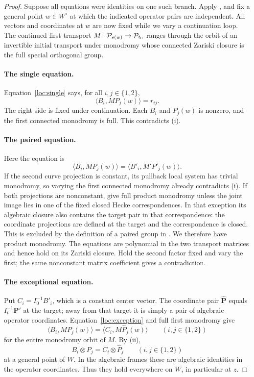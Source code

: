\begin{proof}
Suppose all equations were identities on one such branch.  Apply
, and fix a general point $w\in W^\circ$ at which
the indicated operator pairs are independent.  All vectors and
coordinates at $w$ are now fixed while we vary a continuation loop.
The continued first transport $M:\mathcal P_{s(w)}\to\mathcal P_{t_0}$ ranges through
the orbit of an invertible initial transport under monodromy whose
connected Zariski closure is the full special orthogonal group.

\paragraph{The single equation.}
Equation~\eqref{loc:single} says, for all $i,j\in\{1,2\}$,
\[
 \langle B_i,MP_j(w)\rangle=r_{ij}.
\]
The right side is fixed under continuation.  Each $B_i$ and $P_j(w)$
is nonzero, and the first connected monodromy is full.  This contradicts
(i).

\paragraph{The paired equation.}
Here the equation is
\[
 \langle B_i,MP_j(w)\rangle
   =\langle B'_i,M'P'_j(w)\rangle.
\]
If the second curve projection is constant, its pullback local system
has trivial monodromy, so varying the first connected monodromy already
contradicts (i).  If both projections are
nonconstant,  give full product
monodromy unless the joint image lies in one of the fixed closed Hecke
correspondences.  In that exception its algebraic closure also contains
the target pair in that correspondence: the coordinate projections are
defined at the target and the correspondence is closed.  This is
excluded by the definition of a paired group in .
We therefore have product monodromy.  The equations are polynomial in
the two transport matrices and hence hold on its Zariski closure.
Hold the second factor fixed and vary the first; the same nonconstant
matrix coefficient gives a contradiction.

\paragraph{The exceptional equation.}
Put $C_i=I_0^{-1}B'_i$, which is a constant center vector.  The coordinate
pair $\widehat{\mathbf P}$ equals $I_t^{-1}\mathbf P'$ at the target;
away from that target it is simply a pair of algebraic operator
coordinates.  Equation~\eqref{loc:exception} and full first monodromy
give
\[
 \langle B_i,MP_j(w)\rangle
   =\langle C_i,M\widehat P_j(w)\rangle
       \qquad(i,j\in\{1,2\})
\]
for the entire monodromy orbit of $M$.  By
(ii),
\begin{equation}
 \label{nid:tensors}
 B_i\otimes P_j=C_i\otimes\widehat P_j
       \qquad(i,j\in\{1,2\})
\end{equation}
at a general point of $W$.  In the algebraic frames these are algebraic
identities in the operator coordinates.  Thus they hold everywhere on
$W$, in particular at $z$.


\end{proof}
